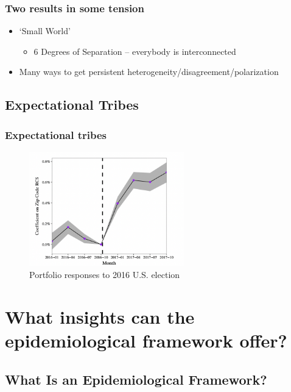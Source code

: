 \documentclass[pdflatex]{beamer}
\begin{document}
\begin{frame}\frametitle{Two results in some tension}

    \begin{itemize}
        \item `Small World'
        \begin{itemize}
            \item 6 Degrees of Separation -- everybody is interconnected
        \end{itemize}
        \item Many ways to get persistent heterogeneity/disagreement/polarization
    \end{itemize}

\end{frame}

\subsection{Expectational Tribes}\label{subsec:ExpTribes}

\begin{frame}
		\frametitle{Expectational tribes}
\begin{figure}[!ht] \centering  %
	\caption{Portfolio responses to 2016 U.S. election}
	\label{fig:parker}
	\centerline{\includegraphics[width=0.6\textwidth]{./figures/parker.png}}
\end{figure}
\end{frame}
\section{What insights can the epidemiological framework
	offer?}\label{what-insights-can-the-epidemiological-framework-offer}



\subsection{What Is an Epidemiological Framework?}
\label{subsec: epi_framework}
\end{document}
